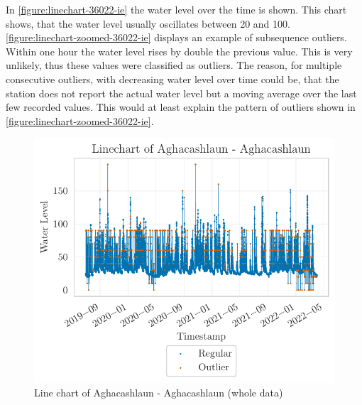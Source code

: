 In \autoref{figure:linechart-36022-ie} the water level over the time is shown. This chart shows, that the water level usually oscillates between 20 and 100. \autoref{figure:linechart-zoomed-36022-ie} displays an example of subsequence outliers. Within one hour the water level rises by double the previous value. This is very unlikely, thus these values were classified as outliers. The reason, for  multiple consecutive outliers, with decreasing water level over time could be, that the station does not report the actual water level but a moving average over the last few recorded values. This would at least explain the pattern of outliers shown in \autoref{figure:linechart-zoomed-36022-ie}.
\begin{figure}[htp]
    \centering
    \includegraphics{./plots/pdfs/36022-ie/linechart_36022-ie.pdf}
    \caption{Line chart of Aghacashlaun - Aghacashlaun (whole data)}
    \label{figure:linechart-36022-ie}
\end{figure}

